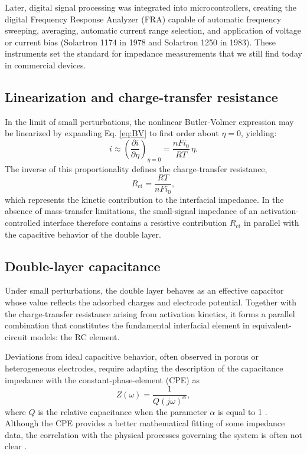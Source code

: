 Later, digital signal processing was integrated into microcontrollers, creating the digital Frequency Response Analyzer (FRA) capable of automatic frequency sweeping, averaging, automatic current range selection, and application of voltage or current bias (Solartron 1174 in 1978 and Solartron 1250 in 1983). 
These instruments set the standard for impedance measurements that we still find today in commercial devices. 

\subsection{Linearization and charge-transfer resistance}

In the limit of small perturbations, the nonlinear Butler-Volmer expression may be linearized by expanding Eq. \ref{eq:BV} to first order about $\eta = 0$, yielding:
\begin{equation}
    i \approx \left( \frac{\partial i}{\partial \eta} \right)_{\eta=0}  = \frac{nF i_0}{RT}\,\eta.
\end{equation}
The inverse of this proportionality defines the charge-transfer resistance,
\begin{equation}
    R_{\mathrm{ct}} = \frac{RT}{nF i_0},
\end{equation}
which represents the kinetic contribution to the interfacial impedance. 
In the absence of mass-transfer limitations, the small-signal impedance of an activation-controlled interface therefore contains a resistive contribution $R_{\mathrm{ct}}$ in parallel with the capacitive behavior of the double layer.

\subsection{Double-layer capacitance}

Under small perturbations, the double layer behaves as an effective capacitor whose value reflects the adsorbed charges and electrode potential. 
Together with the charge-transfer resistance arising from activation kinetics, it forms a parallel combination that constitutes the fundamental interfacial element in equivalent-circuit models: the RC element. 

Deviations from ideal capacitive behavior, often observed in porous or heterogeneous electrodes, require adapting the description of the capacitance impedance with the constant-phase-element (CPE) as
\begin{equation}
    Z(\omega) = \frac{1}{Q (j\omega)^{\alpha}},
\end{equation}
where $Q$ is the relative capacitance when the parameter $\alpha$ is equal to 1 \cite{jorcinCPE2006}.
Although the CPE provides a better mathematical fitting of some impedance data, the correlation with the physical processes governing the system is often not clear \cite{orazemEIS}.

